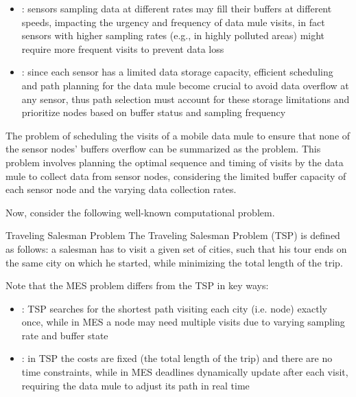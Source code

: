 \documentclass[a4paper, 12pt]{report}
\begin{document}
    \begin{itemize}
        \item {}: sensors sampling data at different rates may fill their buffers at different speeds, impacting the urgency and frequency of data mule visits, in fact sensors with higher sampling rates (e.g., in highly polluted areas) might require more frequent visits to prevent data loss
        \item {}: since each sensor has a limited data storage capacity, efficient scheduling and path planning for the data mule become crucial to avoid data overflow at any sensor, thus path selection must account for these storage limitations and prioritize nodes based on buffer status and sampling frequency
    \end{itemize}

    The problem of scheduling the visits of a mobile data mule to ensure that none of the sensor nodes' buffers overflow can be summarized as the  problem. This problem involves planning the optimal sequence and timing of visits by the data mule to collect data from sensor nodes, considering the limited buffer capacity of each sensor node and the varying data collection rates.

    Now, consider the following well-known computational problem.

    \begin{frameddefn}{Traveling Salesman Problem}
        The Traveling Salesman Problem (TSP) is defined as follows: a salesman has to visit a given set of cities, such that his tour ends on the same city on which he started, while minimizing the total length of the trip.
    \end{frameddefn}

    Note that the MES problem differs from the TSP in key ways:
    
    \begin{itemize}
        \item {}: TSP searches for the shortest path visiting each city (i.e. node) exactly once, while in MES a node may need multiple visits due to varying sampling rate and buffer state
        \item {}: in TSP the costs are fixed (the total length of the trip) and there are no time constraints, while in MES deadlines dynamically update after each visit, requiring the data mule to adjust its path in real time
    \end{itemize}
\end{document}
